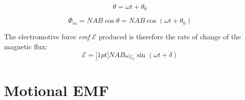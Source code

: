 
%
%    
\begin{equation}
  \theta=\omega t+\theta_0
\end{equation} 
%

\begin{equation}
  \Phi_m=NAB\cos\theta=NAB\cos(\omega t+\theta_0)
\end{equation}
%    

The electromotive force \emph{emf} $\mathcal E$ produced is therefore the
rate of change of the magnetic flux:
\begin{equation}
  \mathcal E =\underbracket[1pt]{NAB\omega}_{\mathcal E_0}\sin(\omega t+\delta)
\end{equation}


\section{Motional EMF}

%
%
%    


